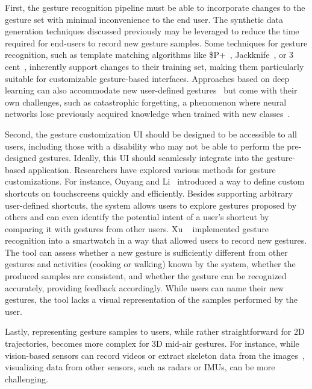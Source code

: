 First, the gesture recognition pipeline must be able to incorporate changes to the gesture set with minimal inconvenience to the end user. The synthetic data generation techniques discussed previously may be leveraged to reduce the time required for end-users to record new gesture samples.
%
Some techniques for gesture recognition, such as template matching algorithms like \$P+~\cite{Vatavu:2017a}, Jackknife~\cite{Taranta:2017}, or 3 cent~\cite{Caputo:2017}, inherently support changes to their training set, making them particularly suitable for customizable gesture-based interfaces. 
%
Approaches based on deep learning can also accommodate new user-defined gestures~\cite{Aich:2023} but come with their own challenges, such as catastrophic forgetting, a phenomenon where neural networks lose previously acquired knowledge when trained with new classes~\cite{Schak:2019, Li:2022}.

Second, the gesture customization UI should be designed to be accessible to all users, including those with a disability who may not be able to perform the pre-designed gestures. Ideally, this UI should seamlessly integrate into the gesture-based application.
%
Researchers have explored various methods for gesture customizations.
%
For instance, Ouyang and Li~\cite{Ouyang:2012} introduced a way to define custom shortcuts on touchscreens quickly and efficiently. Besides supporting arbitrary user-defined shortcuts, the system allows users to explore gestures proposed by others and can even identify the potential intent of a user's shortcut by comparing it with gestures from other users.
%
Xu \etal~\cite{Xu:2022} implemented gesture recognition into a smartwatch in a way that allowed users to record new gestures. The tool can assess whether a new gesture is sufficiently different from other gestures and activities (\eg cooking or walking) known by the system, whether the produced samples are consistent, and whether the gesture can be recognized accurately, providing feedback accordingly. While users can name their new gestures, the tool lacks a visual representation of the samples performed by the user.

Lastly, representing gesture samples to users, while rather straightforward for 2D trajectories, becomes more complex for 3D mid-air gestures. For instance, while vision-based sensors can record videos or extract skeleton data from the images~\cite{DeSmedt:2017,Li:2017b}, visualizing data from other sensors, such as radars or IMUs, can be more challenging.


